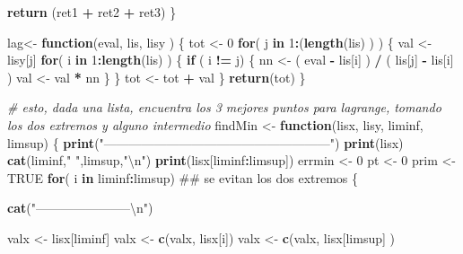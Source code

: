 \documentclass[]{article}
\newenvironment{Shaded}{\begin{snugshade}}{\end{snugshade}}
\newcommand{\KeywordTok}[1]{\textcolor[rgb]{0.13,0.29,0.53}{\textbf{#1}}}
\newcommand{\DecValTok}[1]{\textcolor[rgb]{0.00,0.00,0.81}{#1}}
\newcommand{\CharTok}[1]{\textcolor[rgb]{0.31,0.60,0.02}{#1}}
\newcommand{\StringTok}[1]{\textcolor[rgb]{0.31,0.60,0.02}{#1}}
\newcommand{\CommentTok}[1]{\textcolor[rgb]{0.56,0.35,0.01}{\textit{#1}}}
\newcommand{\OtherTok}[1]{\textcolor[rgb]{0.56,0.35,0.01}{#1}}
\newcommand{\ControlFlowTok}[1]{\textcolor[rgb]{0.13,0.29,0.53}{\textbf{#1}}}
\newcommand{\OperatorTok}[1]{\textcolor[rgb]{0.81,0.36,0.00}{\textbf{#1}}}
\newcommand{\NormalTok}[1]{#1}
\begin{document}
\begin{Shaded}
\begin{Highlighting}[]
  \KeywordTok{return}\NormalTok{ (ret1 }\OperatorTok{+}\StringTok{ }\NormalTok{ret2 }\OperatorTok{+}\StringTok{ }\NormalTok{ret3)}
\NormalTok{\}}

\NormalTok{lag<-}\StringTok{ }\ControlFlowTok{function}\NormalTok{(eval, lis, lisy )}
\NormalTok{\{ }
\NormalTok{  tot <-}\StringTok{ }\DecValTok{0}
  \ControlFlowTok{for}\NormalTok{( j }\ControlFlowTok{in} \DecValTok{1}\OperatorTok{:}\NormalTok{(}\KeywordTok{length}\NormalTok{(lis) ) )}
\NormalTok{  \{}
\NormalTok{    val <-}\StringTok{ }\NormalTok{lisy[j]}
    \ControlFlowTok{for}\NormalTok{( i }\ControlFlowTok{in} \DecValTok{1}\OperatorTok{:}\KeywordTok{length}\NormalTok{(lis)  )}
\NormalTok{    \{}
      \ControlFlowTok{if}\NormalTok{ ( i }\OperatorTok{!=}\StringTok{ }\NormalTok{j)}
\NormalTok{      \{}
\NormalTok{        nn <-}\StringTok{ }\NormalTok{( eval }\OperatorTok{-}\StringTok{ }\NormalTok{lis[i] ) }\OperatorTok{/}\StringTok{ }\NormalTok{( lis[j] }\OperatorTok{-}\StringTok{ }\NormalTok{lis[i] )}
\NormalTok{        val <-}\StringTok{ }\NormalTok{val }\OperatorTok{*}\StringTok{ }\NormalTok{nn}
\NormalTok{      \}}
\NormalTok{    \}}
\NormalTok{    tot <-}\StringTok{ }\NormalTok{tot }\OperatorTok{+}\StringTok{ }\NormalTok{val}
\NormalTok{  \}}
  \KeywordTok{return}\NormalTok{(tot)}
\NormalTok{\}}

\CommentTok{# esto, dada una lista, encuentra los 3 mejores puntos para lagrange, tomando los dos extremos y alguno intermedio}
\NormalTok{findMin <-}\StringTok{ }\ControlFlowTok{function}\NormalTok{(lisx, lisy, liminf, limsup)}
\NormalTok{\{}
  \KeywordTok{print}\NormalTok{(}\StringTok{"------------------------------------------------------"}\NormalTok{)}
  \KeywordTok{print}\NormalTok{(lisx)}
  \KeywordTok{cat}\NormalTok{(liminf,}\StringTok{"  "}\NormalTok{,limsup,}\StringTok{"}\CharTok{\textbackslash{}n}\StringTok{"}\NormalTok{)}
  \KeywordTok{print}\NormalTok{(lisx[liminf}\OperatorTok{:}\NormalTok{limsup])}
\NormalTok{  errmin <-}\StringTok{ }\DecValTok{0}
\NormalTok{  pt <-}\StringTok{ }\DecValTok{0}
\NormalTok{  prim <-}\StringTok{ }\OtherTok{TRUE}
  \ControlFlowTok{for}\NormalTok{( i }\ControlFlowTok{in}\NormalTok{ liminf}\OperatorTok{:}\NormalTok{limsup) ## se evitan los dos extremos}
\NormalTok{  \{}
    
    \KeywordTok{cat}\NormalTok{(}\StringTok{"-----------------------}\CharTok{\textbackslash{}n}\StringTok{"}\NormalTok{)}
    
\NormalTok{    valx <-}\StringTok{ }\NormalTok{lisx[liminf]}
\NormalTok{    valx <-}\StringTok{ }\KeywordTok{c}\NormalTok{(valx, lisx[i])}
\NormalTok{    valx <-}\StringTok{ }\KeywordTok{c}\NormalTok{(valx, lisx[limsup] )}
    

\end{Highlighting}
\end{Shaded}
\end{document}
